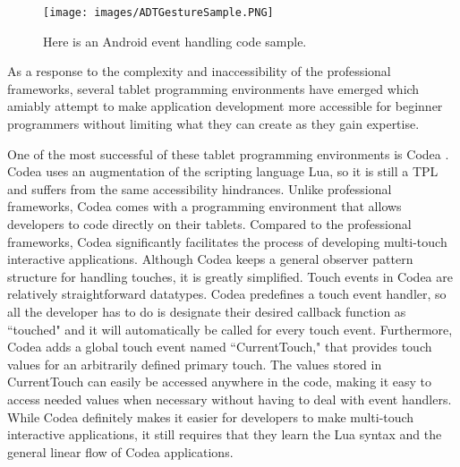 \begin{figure}
\centering
\texttt{[image: images/ADTGestureSample.PNG]}
\caption[Android Event Handling Code Sample]
{Here is an Android event handling code sample.}
\label{ADTGestureSample}
\end{figure}

As a response to the complexity and inaccessibility of the professional frameworks, several tablet programming environments have emerged which amiably attempt to make application development more accessible for beginner programmers without limiting what they can create as they gain expertise. 

One of the most successful of these tablet programming environments is Codea \cite{Codea}. Codea uses an augmentation of the scripting language Lua, so it is still a TPL and suffers from the same accessibility hindrances. Unlike professional frameworks, Codea comes with a programming environment that allows developers to code directly on their tablets. Compared to the professional frameworks, Codea significantly facilitates the process of developing multi-touch interactive applications. Although Codea keeps a general observer pattern structure for handling touches, it is greatly simplified. Touch events in Codea are relatively straightforward datatypes. Codea predefines a touch event handler, so all the developer has to do is designate their desired callback function as ``touched" and it will automatically be called for every touch event. Furthermore, Codea adds a global touch event named ``CurrentTouch," that provides touch values for an arbitrarily defined primary touch. The values stored in CurrentTouch can easily be accessed anywhere in the code, making it easy to access needed values when necessary without having to deal with event handlers. While Codea definitely makes it easier for developers to make multi-touch interactive applications, it still requires that they learn the Lua syntax and the general linear flow of Codea applications. 

